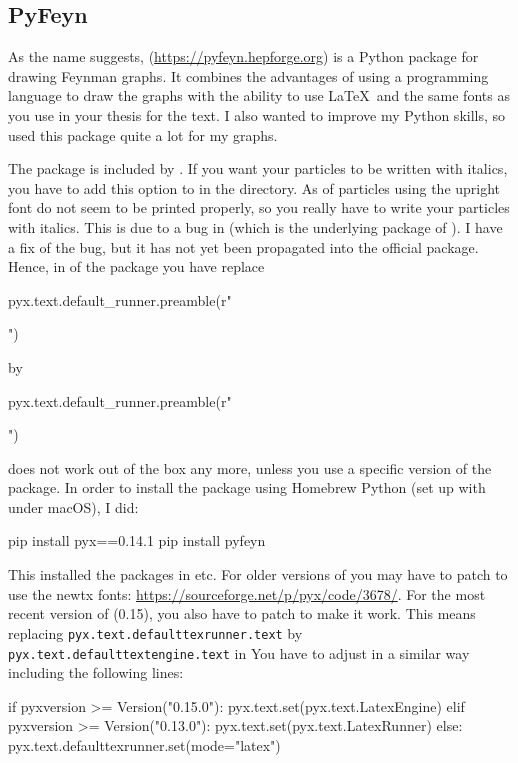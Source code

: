 \subsection{PyFeyn}%
\label{sec:fig:pyfeyn}

As the name suggests,  (\url{https://pyfeyn.hepforge.org})
is a Python package for drawing Feynman graphs.
It combines the advantages of using a programming language to draw the graphs
with the ability to use \LaTeX\ and the same fonts as you use in your thesis for the text.
I also wanted to improve my Python skills, so used this package quite a lot for my graphs.

The package  is included by .
If you want your particles to be written with italics,
you have to add this option to  in the  directory.
As of  particles using the upright font do not seem to be printed properly,
so you really have to write your particles with italics.
This is due to a bug in  (which is the underlying package of ).
I have a fix of the bug, but it has not yet been propagated into the official package.
Hence, in  of the package you have replace
\begin{bashlisting}
pyx.text.default_runner.preamble(r"\usepackage{hepnicenames}")
\end{bashlisting}
by
\begin{bashlisting}
pyx.text.default_runner.preamble(r"\usepackage[italic]{hepnicenames}")
\end{bashlisting}

 does not work out of the box any more,
unless you use a specific version of the  package.
In order to install the package using Homebrew Python (set up with  under macOS), I did:
\begin{bashlisting}
pip install pyx==0.14.1
pip install pyfeyn
\end{bashlisting}
This installed the packages in  etc.
For older versions of  you may have to patch 
to use the newtx fonts: \url{https://sourceforge.net/p/pyx/code/3678/}.
For the most recent version of  (0.15), you also have to patch  to make it work.
This means replacing
\verb+pyx.text.defaulttexrunner.text+ by
\verb+pyx.text.defaulttextengine.text+
in 
You have to adjust  in a similar way including the following lines:
\begin{bashlisting}
if pyxversion >= Version("0.15.0"):
    pyx.text.set(pyx.text.LatexEngine)
elif pyxversion >= Version("0.13.0"):
    pyx.text.set(pyx.text.LatexRunner)
else:
    pyx.text.defaulttexrunner.set(mode="latex")
\end{bashlisting}

